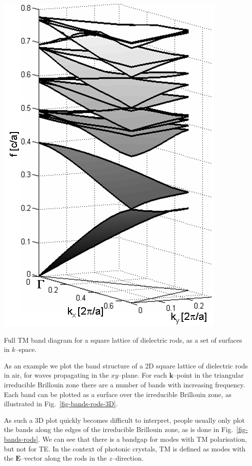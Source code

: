 \begin{marginfigure}
\centering
\includegraphics{symmetry/figures/3d_bands}
\caption{Full TM band diagram for a square lattice of dielectric rods, as a set of surfaces in $k$--space.}
\label{fig-bands-rods-3D}
\end{marginfigure}

As an example we plot the band structure of a 2D square lattice of dielectric rods in air, for waves propagating in the $xy$--plane. For each ${\mathbf k}$--point in the triangular irreducible Brillouin zone there are a number of bands with increasing frequency. Each band can be plotted as a surface over the irreducible Brillouin zone, as illustrated in Fig.~\ref{fig-bands-rods-3D}.

As such a 3D plot quickly becomes difficult to interpret, people usually only plot the bands along the edges of the irreducible Brillouin zone, as is done in Fig.~\ref{fig-bands-rods}. We can see that there is a bandgap for modes with TM polarisation, but not for TE. In the context of photonic crystals, TM is defined as modes with the ${\mathbf E}$--vector along the rods in the $z$--direction.

